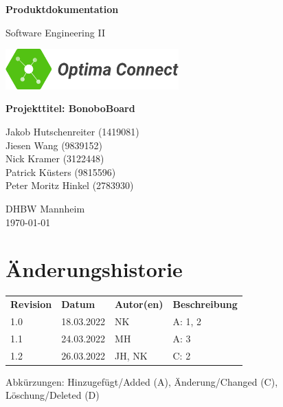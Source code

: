 \documentclass[a4paper,11pt]{scrartcl}
\begin{document}
\renewcommand*{\arraystretch}{1.2}
\begin{titlepage}
    \begin{center}
        \vspace*{1cm}\Huge
        \textbf{Produktdokumentation}\par                
        \vspace{0.5cm}\LARGE        
        Software Engineering II\par           
        \vspace{2cm}
        \includegraphics[width=0.5\textwidth]{OptimaLogo_long}\par   
        \vspace{1cm}
        \textbf{Projekttitel: BonoboBoard}\par        
        \vfill\Large   
        Jakob Hutschenreiter (1419081)\\Jiesen Wang (9839152)\\Nick Kramer (3122448)\\Patrick Küsters (9815596)\\Peter Moritz Hinkel (2783930)\par
        \vspace{2cm}
        DHBW Mannheim\\
        \today     
    \end{center}
\end{titlepage}

\section*{Änderungshistorie}
\begin{table}[h]
	\begin{tabular}{@{} p{20mm} p{25mm} p{25mm} p{75mm}}
		\textbf{Revision} & \textbf{Datum} & \textbf{Autor(en)} & \textbf{Beschreibung}\\
		1.0 & 18.03.2022 & NK & A: 1, 2\\
		1.1 & 24.03.2022 & MH & A: 3\\
        1.2 & 26.03.2022 & JH, NK & C: 2\\
	\end{tabular}
\end{table}
\noindent
Abkürzungen: Hinzugefügt/Added (A), Änderung/Changed (C), Löschung/Deleted (D)
\vspace{2cm}
\tableofcontents
\newpage
{}
\end{document}
